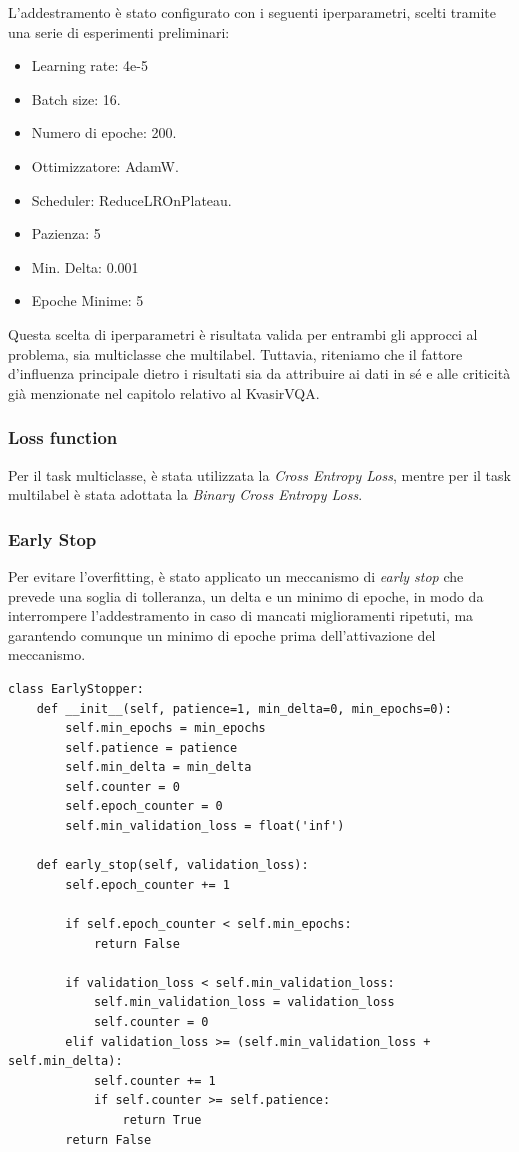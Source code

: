 \documentclass[../main.tex]{subfiles}
\begin{document}
L'addestramento è stato configurato con i seguenti iperparametri, scelti tramite una serie di esperimenti preliminari:

\begin{itemize}
    \item Learning rate: 4e-5
    \item Batch size: 16.
    \item Numero di epoche: 200.
    \item Ottimizzatore: AdamW.
    \item Scheduler: ReduceLROnPlateau.
    \item Pazienza: 5
    \item Min. Delta: 0.001
    \item Epoche Minime: 5
\end{itemize}

Questa scelta di iperparametri è risultata valida per entrambi gli approcci al problema, sia multiclasse che multilabel. 
Tuttavia, riteniamo che il fattore d'influenza principale dietro i risultati sia da attribuire ai dati in sé e alle criticità già menzionate nel capitolo relativo al KvasirVQA.

\subsubsection{Loss function}

Per il task multiclasse, è stata utilizzata la \textit{Cross Entropy Loss}, mentre per il task multilabel è stata adottata la \textit{Binary Cross Entropy Loss}.

\subsubsection{Early Stop}

Per evitare l'overfitting, è stato applicato un meccanismo di \textit{early stop} che prevede una soglia di tolleranza, un delta e un minimo di epoche, in modo da interrompere l'addestramento in caso di mancati miglioramenti ripetuti, ma garantendo comunque un minimo di epoche prima dell'attivazione del meccanismo.

\begin{lstlisting}
class EarlyStopper: 
    def __init__(self, patience=1, min_delta=0, min_epochs=0):
        self.min_epochs = min_epochs
        self.patience = patience
        self.min_delta = min_delta
        self.counter = 0
        self.epoch_counter = 0
        self.min_validation_loss = float('inf')
        
    def early_stop(self, validation_loss):
        self.epoch_counter += 1
        
        if self.epoch_counter < self.min_epochs:
            return False
        
        if validation_loss < self.min_validation_loss:
            self.min_validation_loss = validation_loss
            self.counter = 0
        elif validation_loss >= (self.min_validation_loss + self.min_delta):
            self.counter += 1
            if self.counter >= self.patience:
                return True
        return False
\end{lstlisting}
\end{document}

